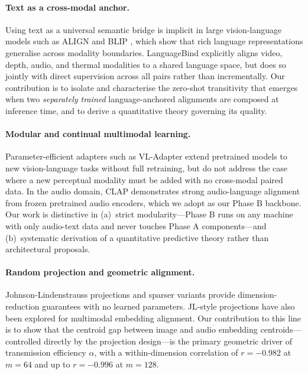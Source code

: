 \documentclass{article}
\begin{document}
\paragraph{Text as a cross-modal anchor.}
Using text as a universal semantic bridge is implicit in large vision-language models such as ALIGN \citep{jia2021align} and BLIP \citep{li2022blip}, which show that rich language representations generalise across modality boundaries.
LanguageBind \citep{zhu2023languagebind} explicitly aligns video, depth, audio, and thermal modalities to a shared language space, but does so jointly with direct supervision across all pairs rather than incrementally.
Our contribution is to isolate and characterise the zero-shot transitivity that emerges when two \emph{separately trained} language-anchored alignments are composed at inference time, and to derive a quantitative theory governing its quality.

\paragraph{Modular and continual multimodal learning.}
Parameter-efficient adapters such as VL-Adapter \citep{sung2022vl} extend pretrained models to new vision-language tasks without full retraining, but do not address the case where a new perceptual modality must be added with no cross-modal paired data.
In the audio domain, CLAP \citep{elizalde2022clap} demonstrates strong audio-language alignment from frozen pretrained audio encoders, which we adopt as our Phase B backbone.
Our work is distinctive in (a)~strict modularity---Phase B runs on any machine with only audio-text data and never touches Phase A components---and (b)~systematic derivation of a quantitative predictive theory rather than architectural proposals.

\paragraph{Random projection and geometric alignment.}
Johnson-Lindenstrauss projections \citep{johnson1984jl} and sparser variants \citep{kane2014sparser} provide dimension-reduction guarantees with no learned parameters.
JL-style projections have also been explored for multimodal embedding alignment.
Our contribution to this line is to show that the centroid gap between image and audio embedding centroids---controlled directly by the projection design---is the primary geometric driver of transmission efficiency $\alpha$, with a within-dimension correlation of $r=-0.982$ at $m=64$ and up to $r=-0.996$ at $m=128$.
\end{document}
